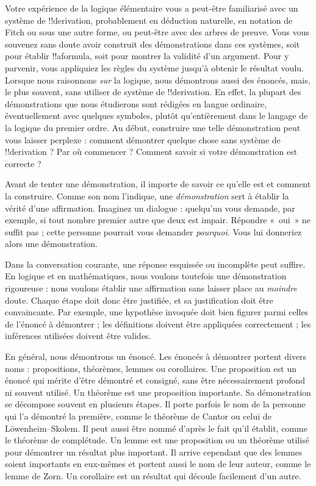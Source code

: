 \documentclass[../../../include/open-logic-section]{subfiles}
\begin{document}


Votre expérience de la logique élémentaire
vous a peut-être familiarisé avec un système
de !!{derivation}, probablement en
déduction naturelle, en notation de Fitch
ou sous une autre forme, ou peut-être
avec des arbres de preuve. Vous vous souvenez
sans doute avoir construit des démonstrations
dans ces systèmes, soit pour établir
!!a{formula}, soit pour montrer la validité
d'un argument. Pour y parvenir, vous
appliquiez les règles du système jusqu'à
obtenir le résultat voulu. Lorsque nous
raisonnons \emph{sur} la logique, nous
démontrons aussi des énoncés, mais,
le plus souvent, sans utiliser de
système de !!{derivation}. En effet,
la plupart des démonstrations que nous
étudierons sont rédigées en langue
ordinaire, éventuellement avec quelques
symboles, plutôt qu'entièrement dans
le langage de la logique du premier ordre.
Au début, construire une telle démonstration
peut vous laisser perplexe : comment
démontrer quelque chose sans système
de !!{derivation} ? Par où commencer ?
Comment savoir si votre démonstration
est correcte ?

Avant de tenter une démonstration, il
importe de savoir ce qu'elle est et
comment la construire. Comme son nom
l'indique, une \emph{démonstration}
sert à établir la vérité d'une
affirmation. Imaginez un dialogue :
quelqu'un vous demande, par exemple,
si tout nombre premier autre que
deux est impair. Répondre «~oui~»
ne suffit pas ; cette personne
pourrait vous demander \emph{pourquoi}.
Vous lui donneriez alors une
démonstration.

Dans la conversation courante,
une réponse esquissée ou incomplète
peut suffire. En logique et en
mathématiques, nous voulons toutefois
une démonstration rigoureuse :
nous voulons établir une affirmation
sans laisser place au \emph{moindre}
doute. Chaque étape doit donc être
justifiée, et sa justification
doit être convaincante. Par exemple,
une hypothèse invoquée doit bien
figurer parmi celles de l'énoncé
à démontrer ; les définitions
doivent être appliquées correctement ;
les inférences utilisées doivent
être valides.

En général, nous démontrons un
énoncé. Les énoncés à démontrer
portent divers noms : propositions,
théorèmes, lemmes ou corollaires.
Une proposition est un énoncé
qui mérite d'être démontré et
consigné, sans être nécessairement
profond ni souvent utilisé.
Un théorème est une proposition
importante. Sa démonstration
se décompose souvent en plusieurs
étapes. Il porte parfois le nom
de la personne qui l'a démontré
la première, comme le théorème
de Cantor ou celui de
L\"owenheim--Skolem. Il peut
aussi être nommé d'après le
fait qu'il établit, comme
le théorème de complétude.
Un lemme est une proposition
ou un théorème utilisé pour
démontrer un résultat plus
important. Il arrive cependant
que des lemmes soient importants
en eux-mêmes et portent aussi
le nom de leur auteur, comme
le lemme de Zorn. Un corollaire
est un résultat qui découle
facilement d'un autre.
\end{document}
